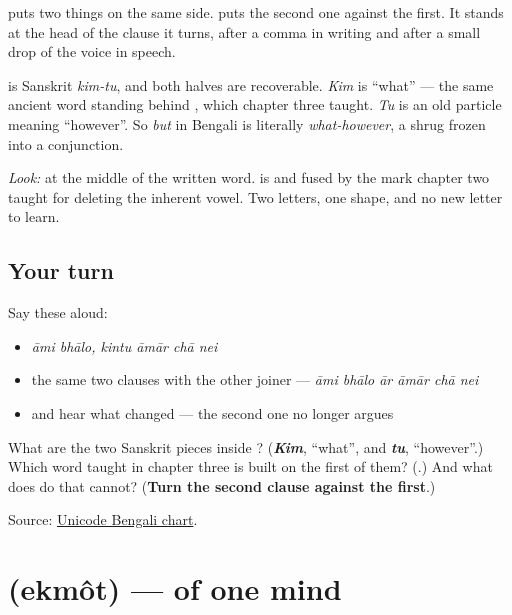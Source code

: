 \textbf{} puts two things on the same side. \textbf{} puts the second one against the first. It stands at the head of the clause it turns, after a comma in writing and after a small drop of the voice in speech.

\begin{cousinweb}
\textbf{} is Sanskrit \emph{kim-tu}, and both halves are recoverable. \emph{Kim} is \textquotedblleft{}what\textquotedblright{} — the same ancient word standing behind \textbf{}, which chapter three taught. \emph{Tu} is an old particle meaning \textquotedblleft{}however\textquotedblright{}. So \emph{but} in Bengali is literally \emph{what-however}, a shrug frozen into a conjunction.

\emph{Look:} at the middle of the written word. \textbf{} is \textbf{} and \textbf{} fused by the mark chapter two taught for deleting the inherent vowel. Two letters, one shape, and no new letter to learn.
\end{cousinweb}

\subsection*{Your turn}
Say these aloud:

\begin{itemize}
\raggedright
  \item \emph{āmi bhālo, kintu āmār chā nei}
  \item the same two clauses with the other joiner — \emph{āmi bhālo ār āmār chā nei}
  \item and hear what changed — the second one no longer argues
\end{itemize}

\begin{tcolorbox}[breakable,colback=teal!4,colframe=teal!35!black,title={Before you move on}]
What are the two Sanskrit pieces inside \textbf{}? (\emph{\textbf{Kim}}, \textquotedblleft{}what\textquotedblright{}, and \emph{\textbf{tu}}, \textquotedblleft{}however\textquotedblright{}.) Which word taught in chapter three is built on the first of them? (\textbf{}.) And what does \textbf{} do that \textbf{} cannot? (\textbf{Turn the second clause against the first}.)

Source: \href{https://www.unicode.org/charts/PDF/U0980.pdf}{Unicode Bengali chart}.
\end{tcolorbox}
\section[\texorpdfstring{\bn{একমত} (ekmôt)}{একমত (ekmôt)}]{ (ekmôt) — of one mind}

